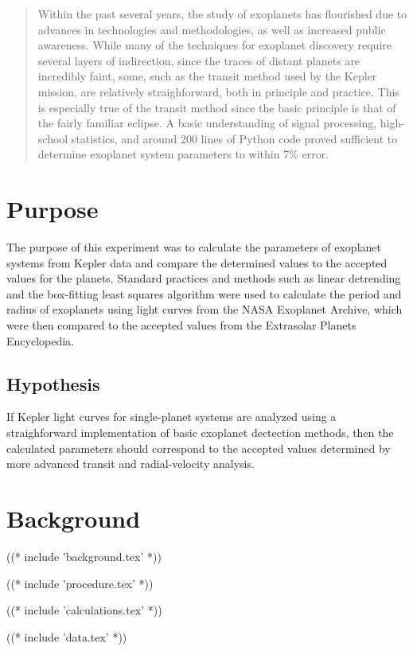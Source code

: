 \documentclass{report}
\begin{document}
\maketitle

\begin{abstract}
    Within the past several years, the study of exoplanets has flourished due to advances in technologies and methodologies, as well as increased public awareness.
    While many of the techniques for exoplanet discovery require several layers of indirection, since the traces of distant planets are incredibly faint, some, such as
    the transit method used by the Kepler mission, are relatively straighforward, both in principle and practice. This is especially true of the transit method since the
    basic principle is that of the fairly familiar eclipse. A basic understanding of signal processing, high-school statistics, and around 200 lines of Python code
    proved sufficient to determine exoplanet system parameters to within 7\% error.
\end{abstract}

\section{Purpose}

The purpose of this experiment was to calculate the parameters of exoplanet systems from Kepler data and compare the determined values to the accepted
values for the planets. Standard practices and methods such as linear detrending and the box-fitting least squares algorithm were used to calculate the
period and radius of exoplanets using light curves from the NASA Exoplanet Archive, which were then compared to the accepted values from the Extrasolar
Planets Encyclopedia.\autocite{exoplanetEncyclopedia, exoplanetArchive}

\subsection{Hypothesis}
If Kepler light curves for single-planet systems are analyzed using a straighforward implementation of basic exoplanet dectection methods, then
the calculated parameters should correspond to the accepted values determined by more advanced transit and radial-velocity analysis.

\section{Background}
% 
((* include 'background.tex' *))

% 
((* include 'procedure.tex' *))

((* include 'calculations.tex' *))

((* include 'data.tex' *))


\nocite{*}
\printbibliography
\end{document}
